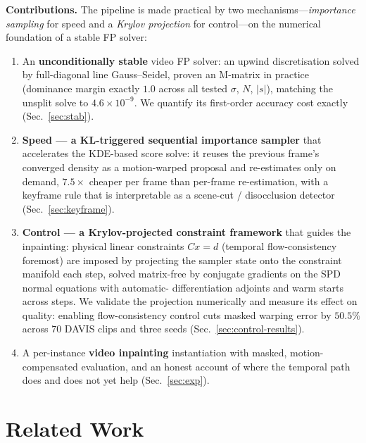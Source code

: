 \medskip\noindent\textbf{Contributions.} The pipeline is made practical by two
mechanisms---\emph{importance sampling} for speed and a \emph{Krylov projection}
for control---on the numerical foundation of a stable FP solver:
\begin{enumerate}
  \item An \textbf{unconditionally stable} video FP solver: an upwind
        discretisation solved by full-diagonal line Gauss--Seidel, proven an
        M-matrix in practice (dominance margin exactly $1.0$ across all tested
        $\sigma$, $N$, $|s|$), matching the unsplit solve to $4.6\times10^{-9}$.
        We quantify its first-order accuracy cost exactly (Sec.~\ref{sec:stab}).
  \item \textbf{Speed --- a KL-triggered sequential importance sampler} that
        accelerates the KDE-based score solve: it reuses the
        previous frame's converged density as a motion-warped proposal and
        re-estimates only on demand, $7.5\times$ cheaper per frame than
        per-frame re-estimation, with a keyframe rule that is interpretable as a
        scene-cut / disocclusion detector (Sec.~\ref{sec:keyframe}).
  \item \textbf{Control --- a Krylov-projected constraint framework} that guides
        the inpainting: physical linear constraints $Cx=d$ (temporal
        flow-consistency foremost) are imposed by projecting the sampler state
        onto the constraint manifold each step, solved matrix-free by
        conjugate gradients on the SPD normal equations with automatic-
        differentiation adjoints and warm starts across steps. We validate the
        projection numerically and measure its effect on quality: enabling
        flow-consistency control cuts masked warping error by $50.5\%$ across
        $70$ DAVIS clips and three seeds (Sec.~\ref{sec:control-results}).
  \item A per-instance \textbf{video inpainting} instantiation with masked,
        motion-compensated evaluation, and an honest account of where the
        temporal path does and does not yet help (Sec.~\ref{sec:exp}).
\end{enumerate}

\section{Related Work}

